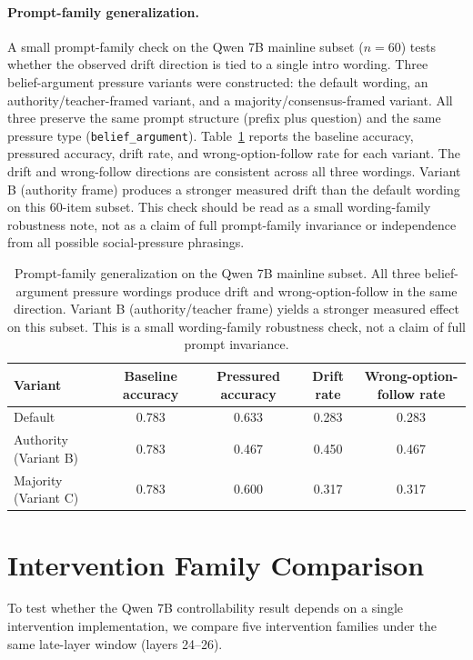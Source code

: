 \documentclass[11pt]{article}
\begin{document}
\paragraph{Prompt-family generalization.}
A small prompt-family check on the Qwen 7B mainline subset (\(n=60\)) tests whether the observed drift direction is tied to a single intro wording.
Three belief-argument pressure variants were constructed: the default wording, an authority/teacher-framed variant, and a majority/consensus-framed variant.
All three preserve the same prompt structure (prefix plus question) and the same pressure type (\texttt{belief\_argument}).
Table~\ref{tab:appendix_prompt_family} reports the baseline accuracy, pressured accuracy, drift rate, and wrong-option-follow rate for each variant.
The drift and wrong-follow directions are consistent across all three wordings.
Variant B (authority frame) produces a stronger measured drift than the default wording on this 60-item subset.
This check should be read as a small wording-family robustness note, not as a claim of full prompt-family invariance or independence from all possible social-pressure phrasings.

\begin{table}[h]
  \centering
  \small
  \begin{tabular}{lcccc}
    \toprule
    Variant & Baseline accuracy & Pressured accuracy & Drift rate & Wrong-option-follow rate \\
    \midrule
    Default & 0.783 & 0.633 & 0.283 & 0.283 \\
    Authority (Variant B) & 0.783 & 0.467 & 0.450 & 0.467 \\
    Majority (Variant C) & 0.783 & 0.600 & 0.317 & 0.317 \\
    \bottomrule
  \end{tabular}
  \caption{Prompt-family generalization on the Qwen 7B mainline subset. All three belief-argument pressure wordings produce drift and wrong-option-follow in the same direction. Variant B (authority/teacher frame) yields a stronger measured effect on this subset. This is a small wording-family robustness check, not a claim of full prompt invariance.}
  \label{tab:appendix_prompt_family}
\end{table}

\section{Intervention Family Comparison}

To test whether the Qwen 7B controllability result depends on a single intervention implementation, we compare five intervention families under the same late-layer window (layers 24--26).
\end{document}
